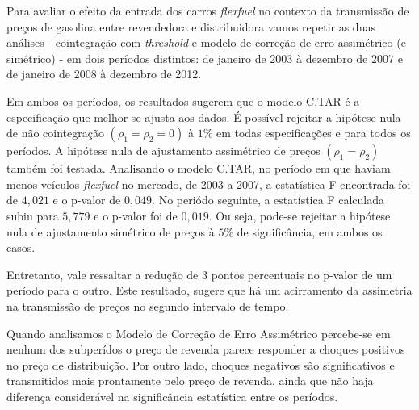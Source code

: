 \documentclass[
	article,			%
	12pt,				%
	openright,			%
	oneside,			%
	a4paper,			%
	english,			%
	brazil				%
	]{abntex2}
\begin{document}
Para avaliar o efeito da entrada dos carros \textit{flexfuel} no contexto da transmissão de preços de gasolina entre revendedora e distribuidora vamos repetir as duas análises - cointegração com \textit{threshold} e modelo de correção de erro assimétrico (e simétrico) - em dois períodos distintos: de janeiro de 2003 à dezembro de 2007 e de janeiro de 2008 à dezembro de 2012.

Em ambos os períodos, os resultados sugerem que o modelo C.TAR é a especificação que melhor se ajusta aos dados. É possível rejeitar a hipótese nula de não cointegração $(\rho_{1}=\rho_{2}=0)$ à $1\%$ em todas especificações e para todos os períodos. A hipótese nula de ajustamento assimétrico de preços $(\rho_{1}=\rho_{2})$ também foi testada. Analisando o modelo C.TAR, no período em que haviam menos veículos \textit{flexfuel} no mercado, de 2003 a 2007, a estatística F encontrada foi de $4,021$ e o p-valor de $0,049$. No periódo seguinte, a estatística F calculada subiu para $5,779$ e o p-valor foi de $0,019$. Ou seja, pode-se rejeitar a hipótese nula de ajustamento simétrico de preços à $5\%$ de significância, em ambos os casos. 

Entretanto, vale ressaltar a redução de $3$ pontos percentuais no p-valor de um período para o outro. Este resultado, sugere que há um acirramento da assimetria na transmissão de preços no segundo intervalo de tempo. 

Quando analisamos o Modelo de Correção de Erro Assimétrico percebe-se em nenhum dos subperídos o preço de revenda parece responder a choques positivos no preço de distribuição. Por outro lado, choques negativos são significativos e transmitidos mais prontamente pelo preço de revenda, ainda que não haja diferença considerável na significância estatística entre os períodos. 
\end{document}
